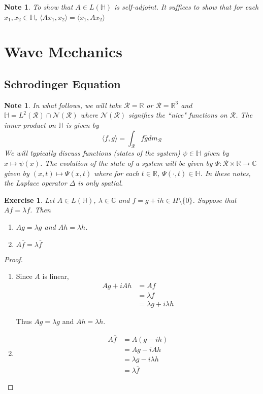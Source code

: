 \documentclass[12pt]{amsart}
\newtheorem{note}[thm]{Note}
\newtheorem{ex}[thm]{Exercise}
\renewcommand{\r}{\rangle}
\renewcommand{\l}{\langle}
\newcommand{\Del}{\Delta}
\newcommand{\lam}{\lambda}
\newcommand{\C}{\mathbb{C}}
\renewcommand{\H}{\mathbb{H}}
\newcommand{\R}{\mathbb{R}}
\newcommand{\MN}{\mathcal{N}}
\renewcommand{\MR}{\mathcal{R}}
\begin{document}
\begin{note}
To show that $A \in L(\H)$ is self-adjoint. It suffices to show that for each $x_1, x_2 \in \H$, $\l Ax_1, x_2 \r = \l x_1, A x_2 \r$
\end{note}

\section{Wave Mechanics}
\subsection{Schrodinger Equation}

\begin{note}
In what follows, we will take $\MR = \R$ or $\MR = \R^3$ and $\H = L^2(\MR) \cap \MN(\MR)$ where $\MN(\MR)$ signifies the ``nice" functions on $\MR$. The inner product on $\H$ is given by $$\l f, g\r = \int_\MR f \overline{g}dm_{\MR}$$ We will typically discuss functions (states of the system) $\psi \in \H$ given by $x \mapsto \psi(x)$. The evolution of the state of a system will be given by $\Psi: \MR \times \R \rightarrow \C$ given by $(x,t) \mapsto \Psi(x,t)$ where for each $t \in \R$, $\Psi(\cdot, t) \in \H$. In these notes, the Laplace operator $\Del $ is only spatial.
\end{note}

\newpage


\begin{ex}
Let $A \in L(\H)$, $\lam \in \C$ and $f = g + ih \in H \setminus \{0\}$. Suppose that $Af = \lam f$. Then 
\begin{enumerate}
\item $A g = \lam g$ and $A h= \lam h$.
\item $A \overline{f} = \lam \overline{f}$
\end{enumerate}
\end{ex}

\begin{proof}\
\begin{enumerate}
\item Since $A$ is linear, 
\begin{align*}
Ag +iAh 
&= Af\\
&= \lam f\\
&= \lam g + i\lam h
\end{align*}

Thus $Ag = \lam g$ and $Ah = \lam h$. \vspace{3mm}
\item 
\begin{align*}
A\overline{f} 
&= A(g-ih)\\
&= Ag -iAh\\
&= \lam g - i \lam h \\
&= \lam \overline{f} 
\end{align*}
\end{enumerate}
\end{proof}
\end{document}
